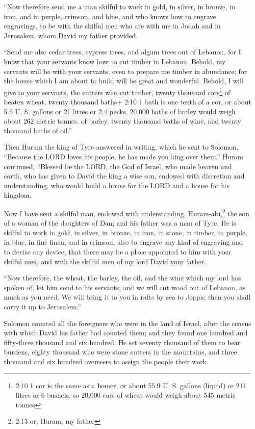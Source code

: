  ``Now therefore send me a man skilful to work in gold, in
silver, in bronze, in iron, and in purple, crimson, and blue, and who
knows how to engrave engravings, to be with the skilful men who are with
me in Judah and in Jerusalem, whom David my father provided.

 ``Send me also cedar trees, cypress trees, and algum trees
out of Lebanon, for I know that your servants know how to cut timber in
Lebanon. Behold, my servants will be with your servants, 
even to prepare me timber in abundance; for the house which I am about
to build will be great and wonderful.  Behold, I will give
to your servants, the cutters who cut timber, twenty thousand
cors\footnote{2:10 1 cor is the same as a homer, or about 55.9 U. S.
  gallons (liquid) or 211 litres or 6 bushels, so 20,000 cors of wheat
  would weigh about 545 metric tonnes} of beaten wheat, twenty thousand
baths+ 2:10 1 bath is one tenth of a cor, or about 5.6 U. S. gallons or
21 litres or 2.4 pecks. 20,000 baths of barley would weigh about 262
metric tonnes. of barley, twenty thousand baths of wine, and twenty
thousand baths of oil.''

 Then Huram the king of Tyre answered in writing, which he
sent to Solomon, ``Because the LORD loves his people, he has made you
king over them.''  Huram continued, ``Blessed be the LORD,
the God of Israel, who made heaven and earth, who has given to David the
king a wise son, endowed with discretion and understanding, who would
build a house for the LORD and a house for his kingdom.

 Now I have sent a skilful man, endowed with understanding,
Huram-abi,\footnote{2:13 or, Huram, my father}  the son of
a woman of the daughters of Dan; and his father was a man of Tyre. He is
skilful to work in gold, in silver, in bronze, in iron, in stone, in
timber, in purple, in blue, in fine linen, and in crimson, also to
engrave any kind of engraving and to devise any device, that there may
be a place appointed to him with your skilful men, and with the skilful
men of my lord David your father.

 ``Now therefore, the wheat, the barley, the oil, and the
wine which my lord has spoken of, let him send to his servants;
 and we will cut wood out of Lebanon, as much as you need.
We will bring it to you in rafts by sea to Joppa; then you shall carry
it up to Jerusalem.''

 Solomon counted all the foreigners who were in the land of
Israel, after the census with which David his father had counted them;
and they found one hundred and fifty-three thousand and six hundred.
 He set seventy thousand of them to bear burdens, eighty
thousand who were stone cutters in the mountains, and three thousand and
six hundred overseers to assign the people their work.

